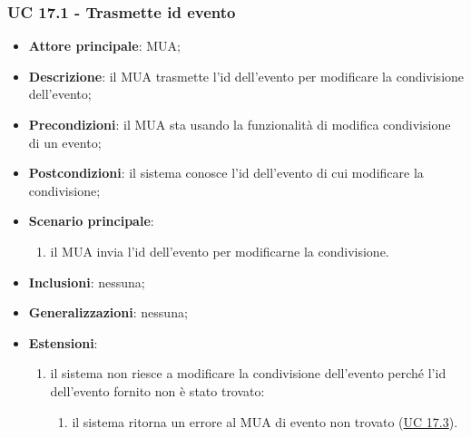     \subsubsection{UC 17.1 - Trasmette id evento} \label{sec:UC17.1}
    \begin{itemize}
        \item \textbf{Attore principale}: MUA;
        \item \textbf{Descrizione}: il MUA trasmette l'id dell'evento per modificare la condivisione dell'evento;
        \item \textbf{Precondizioni}: il MUA sta usando la funzionalità di modifica condivisione di un evento;
        \item \textbf{Postcondizioni}: il sistema conosce l'id dell'evento di cui modificare la condivisione;
        \item \textbf{Scenario principale}:
            \begin{enumerate}
                \item il MUA invia l'id dell'evento per modificarne la condivisione.
            \end{enumerate}
        \item \textbf{Inclusioni}: nessuna;
        \item \textbf{Generalizzazioni}: nessuna;
        \item \textbf{Estensioni}:
            \begin{enumerate}[label=\alph*.]
                \item il sistema non riesce a modificare la condivisione dell'evento perché l'id dell'evento fornito non è stato trovato:
                \begin{enumerate}[label=\arabic*.]
                    \item il sistema ritorna un errore al MUA di evento non trovato (\hyperref[sec:UC17.3]{UC 17.3}).
                \end{enumerate}
            \end{enumerate}
    \end{itemize}


